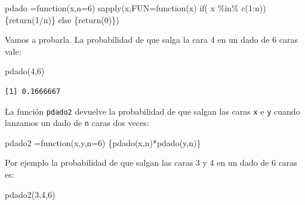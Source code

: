 \documentclass[
  letterpaper,
  DIV=11,
  numbers=noendperiod]{scrreprt}
\newenvironment{Shaded}{\begin{snugshade}}{\end{snugshade}}
\newcommand{\AttributeTok}[1]{\textcolor[rgb]{0.40,0.45,0.13}{#1}}
\newcommand{\ControlFlowTok}[1]{\textcolor[rgb]{0.00,0.23,0.31}{#1}}
\newcommand{\DecValTok}[1]{\textcolor[rgb]{0.68,0.00,0.00}{#1}}
\newcommand{\FunctionTok}[1]{\textcolor[rgb]{0.28,0.35,0.67}{#1}}
\newcommand{\NormalTok}[1]{\textcolor[rgb]{0.00,0.23,0.31}{#1}}
\newcommand{\OtherTok}[1]{\textcolor[rgb]{0.00,0.23,0.31}{#1}}
\newcommand{\SpecialCharTok}[1]{\textcolor[rgb]{0.37,0.37,0.37}{#1}}
\begin{document}
\begin{Shaded}
\begin{Highlighting}[]
\NormalTok{pdado }\OtherTok{=}\ControlFlowTok{function}\NormalTok{(x,}\AttributeTok{n=}\DecValTok{6}\NormalTok{)  }\FunctionTok{sapply}\NormalTok{(x,}\AttributeTok{FUN=}\ControlFlowTok{function}\NormalTok{(x) }
  \ControlFlowTok{if}\NormalTok{( x }\SpecialCharTok{\%in\%} \FunctionTok{c}\NormalTok{(}\DecValTok{1}\SpecialCharTok{:}\NormalTok{n))  \{}\FunctionTok{return}\NormalTok{(}\DecValTok{1}\SpecialCharTok{/}\NormalTok{n)\} }\ControlFlowTok{else}\NormalTok{ \{}\FunctionTok{return}\NormalTok{(}\DecValTok{0}\NormalTok{)\})}
\end{Highlighting}
\end{Shaded}

Vamos a probarla. La probabilidad de que salga la cara 4 en un dado de 6
caras vale:

\begin{Shaded}
\begin{Highlighting}[]
\FunctionTok{pdado}\NormalTok{(}\DecValTok{4}\NormalTok{,}\DecValTok{6}\NormalTok{)}
\end{Highlighting}
\end{Shaded}

\begin{verbatim}
[1] 0.1666667
\end{verbatim}

La función \texttt{pdado2} devuelve la probabilidad de que salgan las
caras \texttt{x} e \texttt{y} cuando lanzamos un dado de \texttt{n}
caras dos veces:

\begin{Shaded}
\begin{Highlighting}[]
\NormalTok{pdado2 }\OtherTok{=}\ControlFlowTok{function}\NormalTok{(x,y,}\AttributeTok{n=}\DecValTok{6}\NormalTok{) \{}\FunctionTok{pdado}\NormalTok{(x,n)}\SpecialCharTok{*}\FunctionTok{pdado}\NormalTok{(y,n)\}}
\end{Highlighting}
\end{Shaded}

Por ejemplo la probabilidad de que salgan las caras 3 y 4 en un dado de
6 caras es:

\begin{Shaded}
\begin{Highlighting}[]
\FunctionTok{pdado2}\NormalTok{(}\DecValTok{3}\NormalTok{,}\DecValTok{4}\NormalTok{,}\DecValTok{6}\NormalTok{)}
\end{Highlighting}
\end{Shaded}
\end{document}
